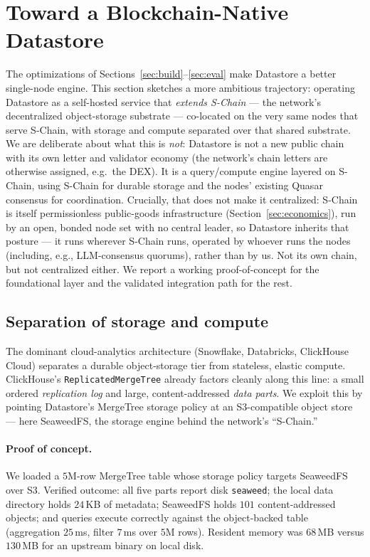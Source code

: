 \section{Toward a Blockchain-Native Datastore}
\label{sec:chain}

The optimizations of Sections~\ref{sec:build}--\ref{sec:eval} make Datastore a
better single-node engine. This section sketches a more ambitious trajectory:
operating Datastore as a self-hosted service that \emph{extends S-Chain} --- the
network's decentralized object-storage substrate --- co-located on the very same
nodes that serve S-Chain, with storage and compute separated over that shared
substrate. We are deliberate about what this is \emph{not}: Datastore is not a
new public chain with its own letter and validator economy (the network's chain
letters are otherwise assigned, e.g.\ the DEX). It is a query/compute engine
layered on S-Chain, using S-Chain for durable storage and the nodes' existing
Quasar consensus for coordination. Crucially, that does not make it centralized:
S-Chain is itself permissionless public-goods infrastructure
(Section~\ref{sec:economics}), run by an open, bonded node set with no central
leader, so Datastore inherits that posture --- it runs wherever S-Chain runs,
operated by whoever runs the nodes (including, e.g., LLM-consensus quorums),
rather than by us. Not its own chain, but not centralized either. We report a
working proof-of-concept for the foundational layer and the validated
integration path for the rest.

\subsection{Separation of storage and compute}

The dominant cloud-analytics architecture (Snowflake, Databricks, ClickHouse
Cloud) separates a durable object-storage tier from stateless, elastic compute.
ClickHouse's \texttt{ReplicatedMergeTree} already factors cleanly along this
line: a small ordered \emph{replication log} and large, content-addressed
\emph{data parts}. We exploit this by pointing Datastore's MergeTree storage
policy at an S3-compatible object store --- here SeaweedFS, the storage engine
behind the network's ``S-Chain.''

\paragraph{Proof of concept.} We loaded a $5$M-row MergeTree table whose
storage policy targets SeaweedFS over S3. Verified outcome: all five parts
report disk \texttt{seaweed}; the local data directory holds $24$\,KB of
metadata; SeaweedFS holds $101$ content-addressed objects; and queries execute
correctly against the object-backed table (aggregation $25$\,ms, filter
$7$\,ms over $5$M rows). Resident memory was $68$\,MB versus $130$\,MB for an
upstream binary on local disk.

